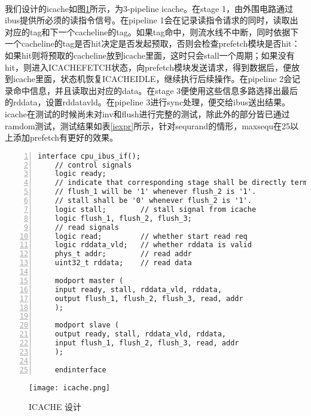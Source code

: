 \documentclass[lang=cn,11pt]{elegantpaper}
\begin{document}
\paragraph{}我们设计的icache如图\ref{icache}所示，为3-pipeline icache。在stage 1，由外围电路通过ibus提供所必须的读指令信号。在pipeline 1会在记录读指令请求的同时，读取出对应的tag和下一个cacheline的tag。如果tag命中，则流水线不中断，同时依据下一个cacheline的tag是否hit决定是否发起预取，否则会检查prefetch模块是否hit：如果hit则将预取的cacheline放到icache里面，这时只会stall一个周期；如果没有hit，则进入ICACHE\underline{\hspace{0.5em}}FETCH状态，向prefetch模块发送请求，得到数据后，便放到icache里面，状态机恢复ICACHE\underline{\hspace{0.5em}}IDLE，继续执行后续操作。在pipeline 2会记录命中信息，并且读取出对应的data。在stage 3便使用这些信息多路选择出最后的rddata，设置rddata\underline{\hspace{0.5em}}vld。在pipeline 3进行sync处理，便交给ibus送出结果。icache在测试的时候尚未对inv和flush进行完整的测试，除此外的部分皆已通过ramdom测试，测试结果如表\ref{iexpr}所示，针对sequ\underline{\hspace{0.5em}}rand的情形，maxsequ在25以上添加prefetch有更好的效果。
\begin{lstlisting}[language={[ANSI]C},numbers=left,numberstyle=\tiny,%frame=shadowbox,
	rulesepcolor=\color{red!20!green!20!blue!20},
	keywordstyle=\color{blue!70!black},
	commentstyle=\color{blue!90!},
	basicstyle=\ttfamily]
	interface cpu_ibus_if();
	// control signals
	logic ready;
	// indicate that corresponding stage shall be directly terminated.
	// flush_1 will be '1' whenever flush_2 is '1'.
	// stall shall be '0' whenever flush_2 is '1'.
	logic stall;		// stall signal from icache
	logic flush_1, flush_2, flush_3;
	// read signals
	logic read;			// whether start read req
	logic rddata_vld;	// whether rddata is valid
	phys_t addr;		// read addr
	uint32_t rddata;	// read data
	
	modport master (
	input ready, stall, rddata_vld, rddata,
	output flush_1, flush_2, flush_3, read, addr
	);
	
	modport slave (
	output ready, stall, rddata_vld, rddata,
	input flush_1, flush_2, flush_3, read, addr
	);
	
	endinterface
\end{lstlisting}
\begin{figure}[htbp]
	\centering
	\texttt{[image: icache.png]}
	\caption{ICACHE 设计}
	\label{icache}
\end{figure}
\end{document}
